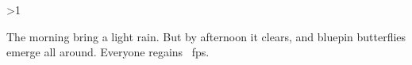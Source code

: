\ifnum\value{temperature}>1

The morning bring a light rain.
But by afternoon it clears, and bluepin butterflies emerge all around.
Everyone regains ~\glspl{fp}.

\fi
